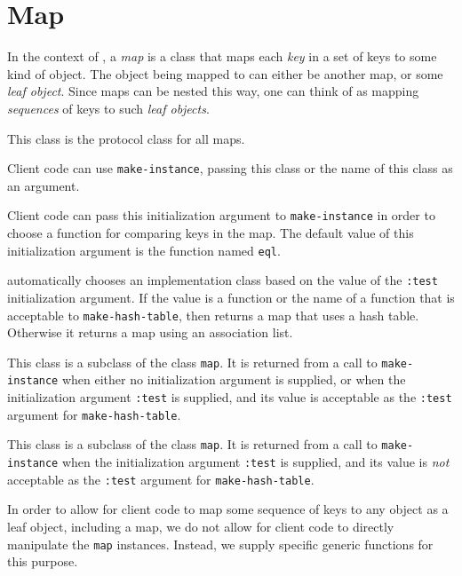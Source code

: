 \chapter{Map}

In the context of \sysname{}, a \emph{map} is a class that maps
each \emph{key} in a set of keys to some kind of object.  The object
being mapped to can either be another map, or some \emph{leaf
  object}.  Since maps can be nested this way, one can think of
\sysname{} as mapping \emph{sequences} of keys to such \emph{leaf
  objects}.


This class is the protocol class for all maps.

Client code can use \texttt{make-instance}, passing this class or the
name of this class as an argument.


Client code can pass this initialization argument to
\texttt{make-instance} in order to choose a function for comparing
keys in the map.  The default value of this initialization argument is
the function named \texttt{eql}.

\sysname{} automatically chooses an implementation class based on the
value of the \texttt{:test} initialization argument.  If the value is
a function or the name of a function that is acceptable to
\texttt{make-hash-table}, then \sysname{} returns a map that uses a
hash table.  Otherwise it returns a map using an association list.


This class is a subclass of the class \texttt{map}.  It is returned
from a call to \texttt{make-instance} when either no initialization
argument is supplied, or when the initialization argument
\texttt{:test} is supplied, and its value is acceptable as the
\texttt{:test} argument for \texttt{make-hash-table}.


This class is a subclass of the class \texttt{map}.  It is returned
from a call to \texttt{make-instance} when the initialization argument
\texttt{:test} is supplied, and its value is \emph{not} acceptable as
the \texttt{:test} argument for \texttt{make-hash-table}.

In order to allow for client code to map some sequence of keys to any
\commonlisp{} object as a leaf object, including a \sysname{} map, we
do not allow for client code to directly manipulate the \texttt{map}
instances.  Instead, we supply specific generic functions for this
purpose.

